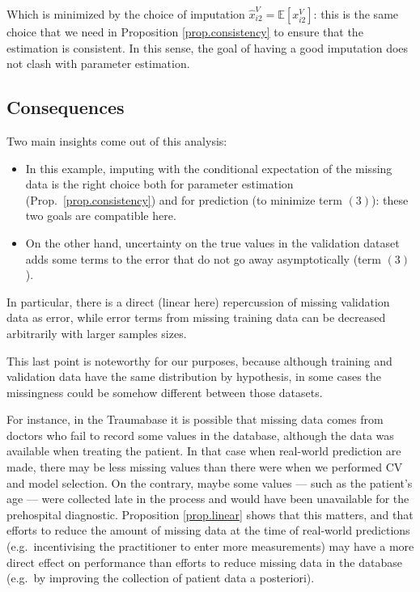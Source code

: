 Which is minimized by the choice of imputation $\hat{x}_{i2}^V = \mathbb{E}[x_{i2}^V]$: this is the same choice that we need in Proposition \ref{prop.consistency} to ensure that the estimation is consistent. In this sense, the goal of having a good imputation does not clash with parameter estimation.
		\subsection{Consequences}
Two main insights come out of this analysis:

\begin{itemize}
\item In this example, imputing with the conditional expectation of the missing data is the right choice both for parameter estimation (Prop.\ \ref{prop.consistency}) and for prediction (to minimize term $(3)$): these two goals are compatible here.

\item On the other hand, uncertainty on the true values in the validation dataset adds some terms to the error that do not go away asymptotically (term $(3)$). 
\end{itemize}

In particular, there is a direct (linear here) repercussion of missing validation data as error, while error terms from missing training data can be decreased arbitrarily with larger samples sizes.

This last point is noteworthy for our purposes, because although training and validation data have the same distribution by hypothesis, in some cases the missingness could be somehow different between those datasets. 

For instance, in the Traumabase it is possible that missing data comes from doctors who fail to record some values in the database, although the data was available when treating the patient. In that case when real-world prediction are made, there may be less missing values than there were when we performed CV and model selection. On the contrary, maybe some values --- such as the patient's age --- were collected late in the process and would have been unavailable for the prehospital diagnostic. Proposition \ref{prop.linear} shows that this matters, and that efforts to reduce the amount of missing data at the time of real-world predictions (e.g.\ incentivising the practitioner to enter more measurements) may have a more direct effect on performance than efforts to reduce missing data in the database (e.g.\ by improving the collection of patient data a posteriori). 
